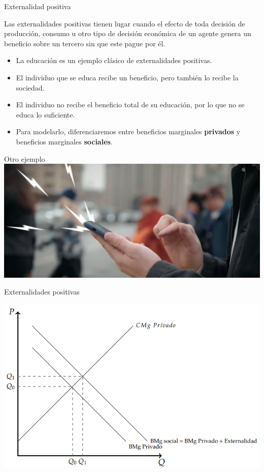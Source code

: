 \documentclass{beamer}
\begin{document}
\begin{frame}{Externalidad positiva}
    \begin{boxA}
        Las externalidades positivas tienen lugar cuando el efecto de
        toda decisión de producción, consumo u otro tipo de decisión
        económica de un agente genera un beneficio sobre un tercero sin
        que este pague por él.
    \end{boxA}
    \begin{itemize}
        \item La educación es un ejemplo clásico de externalidades positivas.
        \item El individuo que se educa recibe un beneficio, pero también lo recibe la sociedad.
        \item El individuo no recibe el beneficio total de su educación, por lo que no se educa lo suficiente.
        \item Para modelarlo, diferenciaremos entre beneficios marginales \textbf{privados} y beneficios marginales \textbf{sociales}.
    \end{itemize}
\end{frame}

\begin{frame}{Otro ejemplo}
    \centering  
    \href{https://econ.video/2022/06/21/the-g-word-with-adam-conover-external-benefits-of-gps/}{\includegraphics[scale=0.25]{../Figures/ExternalidadPII.png}}  
\end{frame}

\begin{frame}{Externalidades positivas}
    \begin{center}
        \includegraphics[scale=0.7]{../Figures/C25.1.png}
    \end{center}
\end{frame}
\end{document}
